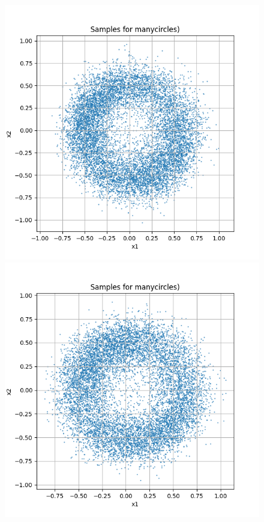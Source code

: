 \documentclass[a4paper,12pt]{article}
\begin{document}
\begin{figure}[h]
  \begin{minipage}{0.3\textwidth}
      \centering
      \includegraphics[width=\linewidth]{"images/Samples for ddpm_2_100_0.0001_0.02_manycircles.png"}
  \end{minipage}
  \begin{minipage}{0.3\textwidth}
      \centering
      \includegraphics[width=\linewidth]{"images/Samples for ddpm_2_150_0.0001_0.02_manycircles.png"}

\end{minipage}
\end{figure}
\end{document}
